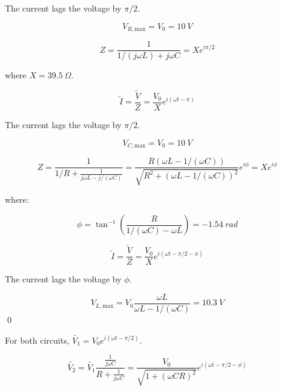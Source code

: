 \documentclass[12pt]{article}
\begin{document}
The current lags the voltage by $\pi/2$.

\begin{equation}
    V_{R, \text{max}} = V_{0} = \qty{10}{V}
\end{equation}


\begin{equation}
    Z = \frac{1}{1/(j \omega L) + j \omega C} = X e^{i\pi/2}
\end{equation}

where $X = \qty{39.5}{\Omega}$.

\begin{equation}
    \tilde{I} = \frac{\tilde{V}}{Z} = \frac{V_{0}}{X} e^{i(\omega t - \pi)}
\end{equation}

The current lags the voltage by $\pi/2$.

\begin{equation}
    V_{C, \text{max}} = V_{0} = \qty{10}{V}
\end{equation}


\begin{equation}
    Z = \frac{1}{1/R + \frac{1}{j \omega L - j/(\omega C)}} = \frac{R(\omega L - 1/(\omega C))}{\sqrt{R^{2} + (\omega L - 1/(\omega C))^{2}}} e^{i\phi} = X e^{i\phi}
\end{equation}

where:

\begin{equation}
    \phi = \tan^{-1}{\left( \frac{R}{1/(\omega C) - \omega L} \right)} = \qty{-1.54}{rad}
\end{equation}

\begin{equation}
    \tilde{I} = \frac{\tilde{V}}{Z} = \frac{V_{0}}{X} e^{i(\omega t - \pi/2 - \phi)}
\end{equation}

The current lags the voltage by $\phi$.

\begin{equation}
    V_{L, \text{max}} = V_{0} \frac{\omega L}{\omega L - 1/(\omega C)} = \qty{10.3}{V}
\end{equation}
\qed


For both circuits, $\tilde{V_{1}} = V_{0} e^{i(\omega t - \pi/2)}$.


\begin{equation}
    \tilde{V_{2}} = \tilde{V_{1}} \frac{\frac{1}{j \omega C}}{R + \frac{1}{j \omega C}} = \frac{V_{0}}{\sqrt{1 + (\omega C R)^{2}}} e^{i(\omega t - \pi/2 - \phi)}
\end{equation}
\end{document}
